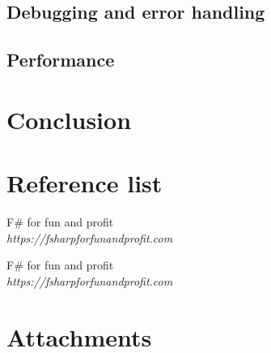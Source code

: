 \documentclass[12pt, a4paper]{article}
\begin{document}
\newpage
\subsection{Debugging and error handling}
\subsection{Performance}
\newpage

\section{Conclusion}
\newpage

\section{Reference list}

\begin{thebibliography}{9}

F\# for fun and profit\\
\emph{https://fsharpforfunandprofit.com}

F\# for fun and profit\\
\emph{https://fsharpforfunandprofit.com}

 
\end{thebibliography}
\newpage

\section{Attachments}
\end{document}

